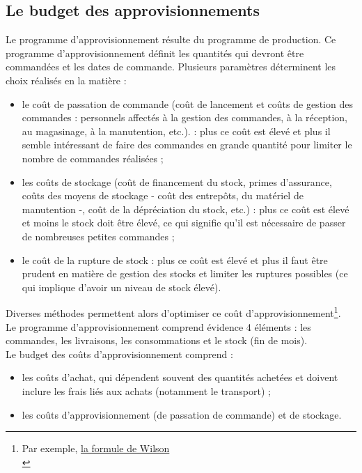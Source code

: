 \documentclass{kaobook}
\begin{document}
\subsection{Le budget des approvisionnements}
\label{sec:org74fe7db}
Le programme d'approvisionnement résulte du programme de production. Ce programme d'approvisionnement définit les quantités qui devront être commandées et les dates de commande. Plusieurs paramètres déterminent les choix réalisés en la matière :\\
\begin{itemize}
\item le coût de passation de commande (coût de lancement et coûts de gestion des commandes : personnels affectés à la gestion des commandes, à la réception, au magasinage, à la manutention, etc.). : plus ce coût est élevé et plus il semble intéressant de faire des commandes en grande quantité pour limiter le nombre de commandes réalisées ;\\
\item les coûts de stockage (coût de financement du stock, primes d'assurance, coûts des moyens de stockage - coût des entrepôts, du matériel de manutention -, coût de la dépréciation du stock, etc.) : plus ce coût est élevé et moins le stock doit être élevé, ce qui signifie qu'il est nécessaire de passer de nombreuses petites commandes ;\\
\item le coût de la rupture de stock : plus ce coût est élevé et plus il faut être prudent en matière de gestion des stocks et limiter les ruptures possibles (ce qui implique d'avoir un niveau de stock élevé).\\
\end{itemize}
Diverses méthodes permettent alors d'optimiser ce coût d'approvisionnement\footnote{Par exemple, \href{https://fr.wikipedia.org/wiki/Formule\_de\_Wilson}{la formule de Wilson}\\}.\\
Le programme d'approvisionnement comprend évidence 4 éléments : les commandes, les livraisons, les consommations et le stock (fin de mois).\\
Le budget des coûts d'approvisionnement comprend :\\
\begin{itemize}
\item les coûts d'achat, qui dépendent souvent des quantités achetées et doivent inclure les frais liés aux achats (notamment le transport) ;\\
\item les coûts d'approvisionnement (de passation de commande) et de stockage.\\
\end{itemize}
\end{document}

